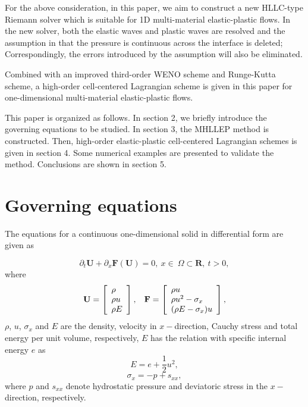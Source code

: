 \documentclass{article}
\numberwithin{equation}{section}
\numberwithin{table}{section}
\begin{document}
For the above consideration, in this paper, we aim to construct a new HLLC-type Riemann solver which is suitable for 1D multi-material elastic-plastic flows. In the new solver, both the elastic waves and plastic waves are resolved and the assumption in \cite{cheng2016harten} that the pressure is continuous across the interface is deleted; Correspondingly, the errors introduced by the assumption will also be eliminated.

Combined with an improved third-order WENO scheme\cite{liu2018novel} and Runge-Kutta scheme, a high-order cell-centered Lagrangian scheme is given in this paper for one-dimensional multi-material elastic-plastic flows.

This paper is organized as follows. In section 2, we briefly introduce the governing equations to be studied. In section 3, the MHLLEP method is constructed.  Then, high-order elastic-plastic cell-centered Lagrangian schemes is given in section 4. Some numerical examples are presented to validate the method.  Conclusions are shown in section 5.
\section{Governing equations}

The equations for a continuous one-dimensional solid in differential form are given as

\begin{equation*}
\partial_t \mathbf{{U}} + \partial _x \bm{F}(\mathbf{{U}}) = 0, \   x \in \   \Omega \subset \mathbf{R}, \  t>0,
\end{equation*}
where
\begin{equation}
  \mathbf{U} = \left[ \begin{array}{l}
	  \rho \\
	  \rho u \\
	  \rho  E \\
	\end{array}
  \right],
  \hspace{0.3cm}
  \mathbf{F} = \left[ \begin{array}{l}
	  \rho u \\
	  \rho u^2 -\sigma_x\\
	  (\rho E -\sigma_x)u\\
  \end{array} \right],
\end{equation}
$\rho$, $u$, $\sigma_x$ and $E$ are  the density, velocity in $x-$direction, Cauchy stress and total energy per unit volume, respectively, $E$ has the relation with specific internal energy $e$ as
\begin{equation}
  E = e+\frac{1}{2}u^2,
\end{equation}
\begin{equation}
  \sigma_x = -p +s_{xx},
\end{equation}
where $p$ and $s_{xx}$ denote hydrostatic pressure and deviatoric stress in the $x-$ direction, respectively.
\end{document}
